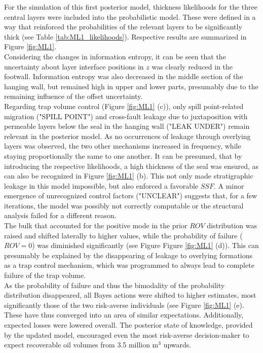 		For the simulation of this first posterior model, thickness likelihoods for the three central layers were included into the probabilistic model. These were defined in a way that reinforced the probabilities of the relevant layers to be significantly thick (see Table \ref{tab:ML1_likelihoods}). Respective results are summarized in Figure \ref{fig:ML1}.\\
		Considering the changes in information entropy, it can be seen that the uncertainty about layer interface positions in $z$ was clearly reduced in the footwall. Information entropy was also decreased in the middle section of the hanging wall, but remained high in upper and lower parts, presumably due to the remaining influence of the offset uncertainty.\\
		Regarding trap volume control (Figure \ref{fig:ML1} (c)), only spill point-related migration ("SPILL POINT") and cross-fault leakage due to juxtaposition with permeable layers below the seal in the hanging wall ("LEAK UNDER") remain relevant in the posterior model. As no occurrences of leakage through overlying layers was observed, the two other mechanisms increased in frequency, while staying proportionally the same to one another. It can be presumed, that by introducing the respective likelihoods, a high thickness of the seal was ensured, as can also be recognized in Figure \ref{fig:ML1} (b). This not only made stratigraphic leakage in this model impossible, but also enforced a favorable $SSF$. A minor emergence of unrecognized control factors ("UNCLEAR") suggests that, for a few iterations, the model was possibly not correctly computable or the structural analysis failed for a different reason.\\
		The bulk that accounted for the positive mode in the prior $ROV$ distribution was raised and shifted laterally to higher values, while the probability of failure ($ROV = 0$) was diminished significantly (see Figure Figure \ref{fig:ML1} (d)). This can presumably be explained by the disappearing of leakage to overlying formations as a trap control mechanism, which was programmed to always lead to complete failure of the trap volume.\\
		As the probability of failure and thus the bimodality of the probability distribution disappeared, all Bayes actions were shifted to higher estimates, most significantly those of the two risk-averse individuals (see Figure \ref{fig:ML1} (e). These have thus converged into an area of similar expectations. Additionally, expected losses were lowered overall. The posterior state of knowledge, provided by the updated model, encouraged even the most risk-averse decision-maker to expect recoverable oil volumes from 3.5 million m$^3$ upwards.
		
